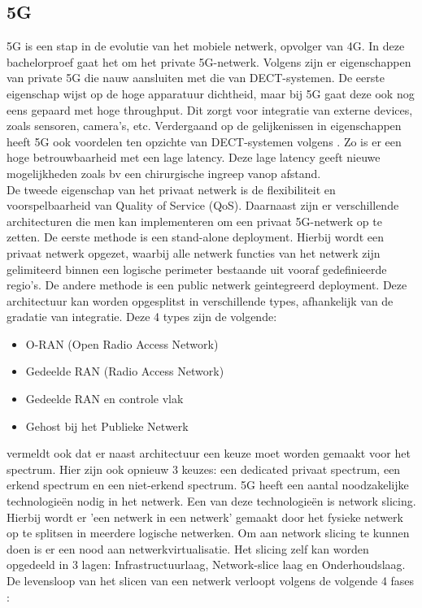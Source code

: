 \subsection{5G}
5G is een stap in de evolutie van het mobiele netwerk, opvolger van 4G. In deze bachelorproef gaat het om het private 5G-netwerk. Volgens \textcite{wen2021private} zijn er eigenschappen van private 5G die nauw aansluiten met die van DECT-systemen. De eerste eigenschap wijst op de hoge apparatuur dichtheid, maar bij 5G gaat deze ook nog eens gepaard met hoge throughput. Dit zorgt voor integratie van externe devices, zoals sensoren, camera's, etc. Verdergaand op de gelijkenissen in eigenschappen heeft 5G ook voordelen ten opzichte van DECT-systemen volgens \textcite{wen2021private}. Zo is er een hoge betrouwbaarheid met een lage latency. Deze lage latency geeft nieuwe mogelijkheden zoals bv een chirurgische ingreep vanop afstand.\\ De tweede eigenschap van het privaat netwerk is de flexibiliteit en voorspelbaarheid van Quality of Service (QoS). Daarnaast zijn er verschillende architecturen die men kan implementeren om een privaat 5G-netwerk op te zetten. De eerste methode is een stand-alone deployment. Hierbij wordt een privaat netwerk opgezet, waarbij alle netwerk functies van het netwerk zijn gelimiteerd binnen een logische perimeter bestaande uit vooraf gedefinieerde regio's. De andere methode is een public netwerk geintegreerd deployment. Deze architectuur kan worden opgesplitst in verschillende types, afhankelijk van de gradatie van integratie. Deze 4 types zijn de volgende:

\begin{itemize}
  \item O-RAN (Open Radio Access Network)
  \item Gedeelde RAN (Radio Access Network)
  \item Gedeelde RAN en controle vlak
  \item Gehost bij het Publieke Netwerk
\end{itemize}



\textcite{wen2021private} vermeldt ook dat er naast architectuur een keuze moet worden gemaakt voor het spectrum. Hier zijn ook opnieuw 3 keuzes: een dedicated privaat spectrum, een erkend spectrum en een niet-erkend spectrum. 
5G heeft een aantal noodzakelijke technologieën nodig in het netwerk. Een van deze technologieën is network slicing. Hierbij wordt er 'een netwerk in een netwerk' gemaakt door het fysieke netwerk op te splitsen in meerdere logische netwerken. Om aan network slicing te kunnen doen is er een nood aan netwerkvirtualisatie. Het slicing zelf kan worden opgedeeld in 3 lagen: Infrastructuurlaag, Network-slice laag en Onderhoudslaag. De levensloop van het slicen van een netwerk verloopt volgens de volgende 4 fases \autocite{wen2021private}:

